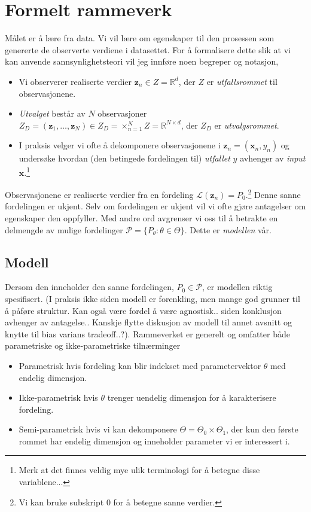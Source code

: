\section{Formelt rammeverk}
Målet er å lære fra data. Vi vil lære om egenskaper til den prosessen som genererte de observerte verdiene i datasettet. For å formalisere dette slik at vi kan anvende sannsynlighetsteori vil jeg innføre noen begreper og notasjon,
\begin{itemize}
\item Vi observerer realiserte verdier $\mathbf{z}_n \in Z = \mathbb{R}^d$, der $Z$ er \textit{utfallsrommet} til observasjonene.
\item \textit{Utvalget} består av $N$ observasjoner $Z_D = (\mathbf{z}_1, \dots ,\mathbf{z}_N) \in Z_D = \times_{n=1}^N Z = \mathbb{R}^{N\times d}$, der $Z_D$ er \textit{utvalgsrommet}.
\item I praksis velger vi ofte å dekomponere observasjonene i $\mathbf{z}_n = (\mathbf{x}_n, y_n)$ og undersøke hvordan (den betingede fordelingen til) \textit{utfallet} $y$ avhenger av \textit{input} $\mathbf{x}$.\footnote{Merk at det finnes veldig mye ulik terminologi for å betegne disse variablene...}
\end{itemize}
Observasjonene er realiserte verdier fra en fordeling $\mathcal{L}(\mathbf{z}_n) = P_0$.\footnote{Vi kan bruke subskript 0 for å betegne sanne verdier.} Denne sanne fordelingen er ukjent. Selv om fordelingen er ukjent vil vi ofte gjøre antagelser om egenskaper den oppfyller. Med andre ord avgrenser vi oss til å betrakte en delmengde av mulige fordelinger $\mathscr{P}=\{P_{\theta}:\theta\in\Theta\}$. Dette er \textit{modellen} vår.
\subsection{Modell}
Dersom den inneholder den sanne fordelingen, $P_0 \in \mathscr{P}$, er modellen riktig spesifisert. (I praksis ikke siden modell er forenkling, men mange god grunner til å påføre struktur. Kan også være fordel å være agnostisk.. siden konklusjon avhenger av antagelse.. Kanskje flytte diskusjon av modell til annet avsnitt og knytte til bias varians tradeoff..?). Rammeverket er generelt og omfatter både parametriske og ikke-parametriske tilnærminger
\begin{itemize}
\item Parametrisk hvis fordeling kan blir indekset med parametervektor $\theta$ med endelig dimensjon.
\item Ikke-parametrisk hvis $\theta$ trenger uendelig dimensjon for å karakterisere fordeling.
\item Semi-parametrisk hvis vi kan dekomponere $\Theta = \Theta_0 \times \Theta_1$, der kun den første rommet har endelig dimensjon og inneholder parameter vi er interessert i.
\end{itemize}
